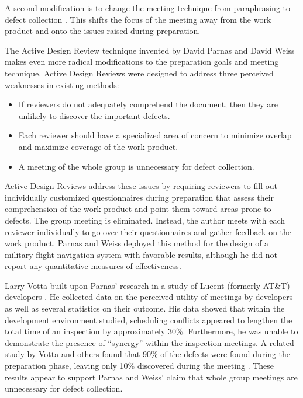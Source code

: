 A second modification is to change the meeting technique from paraphrasing
to defect collection \cite{Gilb93,Humphrey90}.  This shifts the focus of the
meeting away from the work product and onto the issues raised during
preparation. 

The Active Design Review technique \cite{parnas.1985} invented by David Parnas
and David Weiss makes even more radical modifications to the preparation goals 
and meeting technique. Active Design Reviews were designed to address three perceived
weaknesses in existing methods:

\begin{itemize}
\item If reviewers do not adequately comprehend the document, then they are
      unlikely to discover the important defects. 
\item Each reviewer should have a specialized area of concern to minimize 
      overlap and maximize coverage of the work product.
\item A meeting of the whole group is unnecessary for defect collection. 
\end{itemize}

Active Design Reviews address these issues by requiring reviewers to fill
out individually customized questionnaires during preparation that assess
their comprehension of the work product and point them toward areas prone
to defects.  The group meeting is eliminated. Instead, the author meets
with each reviewer individually to go over their questionnaires and gather
feedback on the work product. Parnas and Weiss deployed this method for the 
design of a military flight navigation system with favorable results, although he
did not report any quantitative measures of effectiveness.

Larry Votta built upon Parnas' research in a study of Lucent (formerly 
AT\&T) developers \cite{votta.1993}.  He collected data on the 
perceived utility of meetings by developers as well as 
several statistics on their outcome. His
data showed that within the development environment studied, scheduling
conflicts appeared to lengthen the total time of an inspection by
approximately 30\%.  Furthermore, he was unable to demonstrate the presence
of ``synergy'' within the inspection meetings. A related study by Votta and 
others found that 90\% of
the defects were found during the preparation phase, leaving only 10\%
discovered during the meeting \cite{eick.et.al.1992}.  These results appear to
support Parnas and Weiss' claim that whole group meetings are unnecessary for defect
collection.

